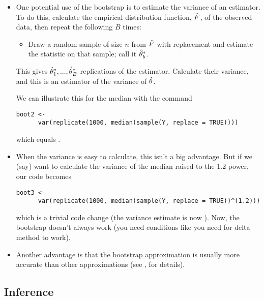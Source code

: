 \begin{itemize}

\item One potential use of the bootstrap is to estimate the variance
  of an estimator.  To do this, calculate the empirical distribution
  function, $\hat{F}$, of the observed data, then repeat the following $B$
  times:
  \begin{itemize}
  \item Draw a random sample of size $n$ from $\hat{F}$ with replacement
    and estimate the statistic on that sample; call it $\hat{\theta}^*_b$.
  \end{itemize}
  This gives $\hat{\theta}^*_1,...,\hat{\theta}^*_B$ replications of the estimator.
  Calculate their variance, and this is an estimator of the variance
  of $\hat{\theta}$.

  We can illustrate this for the median with the command
  \begin{lstlisting}[firstline=2,gobble=6]
    boot2 <-
      var(replicate(1000, median(sample(Y, replace = TRUE))))
  \end{lstlisting}
  which equals \medv.

\item When the variance is easy to calculate, this isn't a big
  advantage.  But if we (say) want to calculate the variance of the
  median raised to the 1.2 power, our code becomes
  \begin{lstlisting}[firstline=2,gobble=6]
    boot3 <-
      var(replicate(1000, median(sample(Y, replace = TRUE))^(1.2)))
  \end{lstlisting}
  which is a trivial code change (the variance estimate is now \powv).
  Now, the bootstrap doesn't always work (you need conditions like you
  need for delta method to work).

\item Another advantage is that the bootstrap approximation is usually
  more accurate than other approximations (see \citealp{Hal91}, for
  details).

\end{itemize}

\subsection{Inference}

